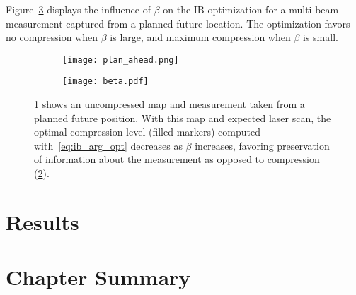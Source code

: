 



Figure~\ref{fig:loss_compression} displays the influence of $\beta$ on the IB optimization for a multi-beam measurement captured from a planned future location. The optimization favors no compression when $\beta$ is large, and maximum compression when $\beta$ is small.

\begin{figure}
    \centering
    \begin{subfigure}[t]{0.45\textwidth}
        \centering
        \texttt{[image: plan\_ahead.png]}
        \caption{\label{fig:loss_compression1}}
    \end{subfigure}
    \hfill
    \begin{subfigure}[t]{0.45\textwidth}
        \centering
        \texttt{[image: beta.pdf]}
        \caption{\label{fig:loss_compression2}}
    \end{subfigure}
    \caption{\ref{fig:loss_compression1} shows an uncompressed map and measurement taken from a planned future position. With this map and expected laser scan, the optimal compression level (filled markers) computed with~\eqref{eq:ib_arg_opt} decreases as $\beta$ increases, favoring preservation of information about the measurement as opposed to compression (\ref{fig:loss_compression2}). \label{fig:loss_compression}}
\end{figure}

\section{Results}

\section{Chapter Summary}
